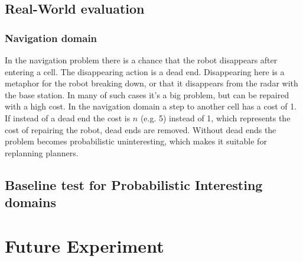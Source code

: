 \documentclass[runningheads,a4paper]{llncs}
\begin{document}

%
%

\subsection{Real-World evaluation}

\subsubsection{Navigation domain}

In the navigation problem there is a chance that the robot disappears after
entering a cell. The disappearing action is a dead end. Disappearing here is a
metaphor for the robot breaking down, or that it disappears from the radar with
the base station. In many of such cases it's a big problem, but can be repaired
with a high cost. In the navigation domain a step to another cell has a cost of
1. If instead of a dead end the cost is $n$ (e.g. 5) instead of 1, which
represents the cost of repairing the robot, dead ends are removed. Without dead
ends the problem becomes probabilistic uninteresting, which makes it suitable for
replanning planners.

\subsection{Baseline test for Probabilistic Interesting domains}


\section{Future Experiment}
\label{sec:experiment}
\end{document}
